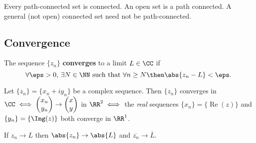 \documentclass[12pt, a4paper]{article}
\DeclareMathOperator{\R}{Re}
\begin{document}
\begin{theorem}
    Every path-connected set is connected. An open set is a path connected. A general (not open) connected set need not be path-connected.
\end{theorem}

\subsection{Convergence}

\begin{definition}
    The sequence \(\{z_n\}\) \textbf{converges} to a limit \(L \in \CC\) if 
    \[\forall \eps>0, \, \exists N\in \NN \text{ such that } \forall n \geq N \then \abs{z_n -L}<\eps.\]
\end{definition}

\begin{mdthm}
    Let \(\{z_n\}=\{x_n+iy_n\}\) be a complex sequence. Then \(\{z_n\}\) converges in \(\CC \iff \begin{pmatrix} x_n \\y_n\end{pmatrix} \to \begin{pmatrix} x \\y\end{pmatrix}\) in \(\RR^2 \iff\) the \textit{real} sequences \(\{x_n\}=\{\R(z)\}\) and \(\{y_n\}=\{\Img(z)\}\) both converge in \(\RR^1\).
\end{mdthm}

\begin{proposition}
    If \(z_n \to L\) then \(\abs{z_n} \to \abs{L}\) and \(\overline{z_n} \to \overline{L}\).
\end{proposition}
\end{document}
